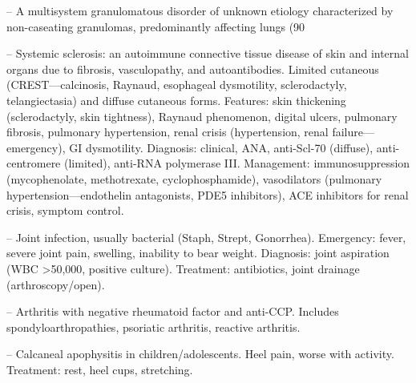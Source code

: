 -- A multisystem granulomatous disorder of unknown etiology characterized by non-caseating granulomas, predominantly affecting lungs (90%

-- Systemic sclerosis: an autoimmune connective tissue disease of skin and internal organs due to fibrosis, vasculopathy, and autoantibodies. Limited cutaneous (CREST—calcinosis, Raynaud, esophageal dysmotility, sclerodactyly, telangiectasia) and diffuse cutaneous forms. Features: skin thickening (sclerodactyly, skin tightness), Raynaud phenomenon, digital ulcers, pulmonary fibrosis, pulmonary hypertension, renal crisis (hypertension, renal failure—emergency), GI dysmotility. Diagnosis: clinical, ANA, anti-Scl-70 (diffuse), anti-centromere (limited), anti-RNA polymerase III. Management: immunosuppression (mycophenolate, methotrexate, cyclophosphamide), vasodilators (pulmonary hypertension—endothelin antagonists, PDE5 inhibitors), ACE inhibitors for renal crisis, symptom control.

-- Joint infection, usually bacterial (Staph, Strept, Gonorrhea). Emergency: fever, severe joint pain, swelling, inability to bear weight. Diagnosis: joint aspiration (WBC >50,000, positive culture). Treatment: antibiotics, joint drainage (arthroscopy/open).

-- Arthritis with negative rheumatoid factor and anti-CCP. Includes spondyloarthropathies, psoriatic arthritis, reactive arthritis.

-- Calcaneal apophysitis in children/adolescents. Heel pain, worse with activity. Treatment: rest, heel cups, stretching.

